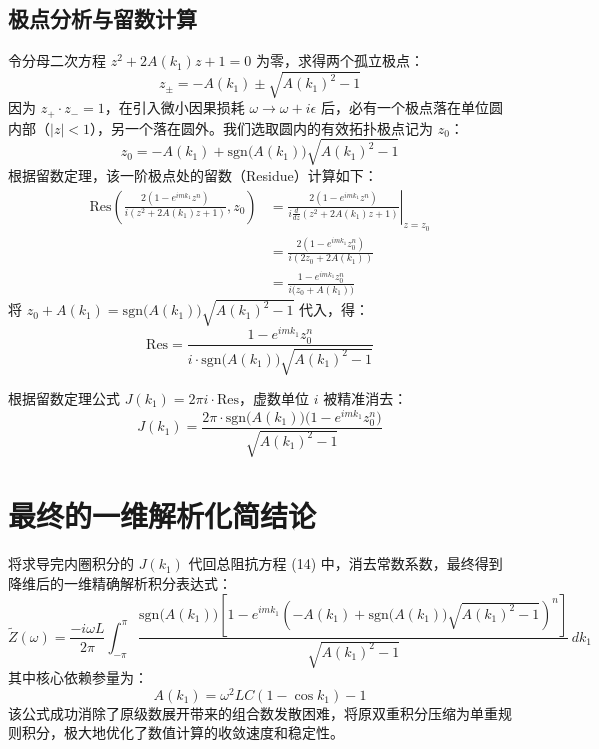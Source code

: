 \documentclass[11pt,a4paper]{ctexart}
\begin{document}
\subsection{极点分析与留数计算}
令分母二次方程 $z^2 + 2A(k_1)z + 1 = 0$ 为零，求得两个孤立极点：
\begin{equation}
z_\pm = -A(k_1) \pm \sqrt{A(k_1)^2 - 1}
\end{equation}
因为 $z_+ \cdot z_- = 1$，在引入微小因果损耗 $\omega \to \omega + i\epsilon$ 后，必有一个极点落在单位圆内部（$|z| < 1$），另一个落在圆外。我们选取圆内的有效拓扑极点记为 $z_0$：
\begin{equation}
z_0 = -A(k_1) + \text{sgn}\big(A(k_1)\big)\sqrt{A(k_1)^2 - 1}
\end{equation}
根据留数定理，该一阶极点处的留数（Residue）计算如下：
\begin{align}
\text{Res}\left( \frac{2(1 - e^{i m k_1} z^n)}{i(z^2 + 2A(k_1)z + 1)}, z_0 \right) &= \left. \frac{2(1 - e^{i m k_1} z^n)}{i \frac{d}{dz}(z^2 + 2A(k_1)z + 1)} \right|_{z=z_0} \nonumber \\
&= \frac{2(1 - e^{i m k_1} z_0^n)}{i(2z_0 + 2A(k_1))} \nonumber \\
&= \frac{1 - e^{i m k_1} z_0^n}{i \big(z_0 + A(k_1)\big)}
\end{align}
将 $z_0 + A(k_1) = \text{sgn}\big(A(k_1)\big)\sqrt{A(k_1)^2 - 1}$ 代入，得：
\begin{equation}
\text{Res} = \frac{1 - e^{i m k_1} z_0^n}{i \cdot \text{sgn}\big(A(k_1)\big)\sqrt{A(k_1)^2 - 1}}
\end{equation}

根据留数定理公式 $J(k_1) = 2\pi i \cdot \text{Res}$，虚数单位 $i$ 被精准消去：
\begin{equation}
J(k_1) = \frac{2\pi \cdot \text{sgn}\big(A(k_1)\big) \big(1 - e^{i m k_1} z_0^n\big)}{\sqrt{A(k_1)^2 - 1}}
\end{equation}

\section{最终的一维解析化简结论}
将求导完内圈积分的 $J(k_1)$ 代回总阻抗方程 (14) 中，消去常数系数，最终得到降维后的一维精确解析积分表达式：
\begin{equation}
\tilde{Z}(\omega) = \frac{-i\omega L}{2\pi} \int_{-\pi}^{\pi} \frac{\text{sgn}\big(A(k_1)\big) \left[ 1 - e^{i m k_1} \left( -A(k_1) + \text{sgn}\big(A(k_1)\big)\sqrt{A(k_1)^2 - 1} \right)^n \right]}{\sqrt{A(k_1)^2 - 1}} \, dk_1
\end{equation}
其中核心依赖参量为：
\begin{equation}
A(k_1) = \omega^2 L C (1 - \cos k_1) - 1
\end{equation}
该公式成功消除了原级数展开带来的组合数发散困难，将原双重积分压缩为单重规则积分，极大地优化了数值计算的收敛速度和稳定性。
\end{document}
